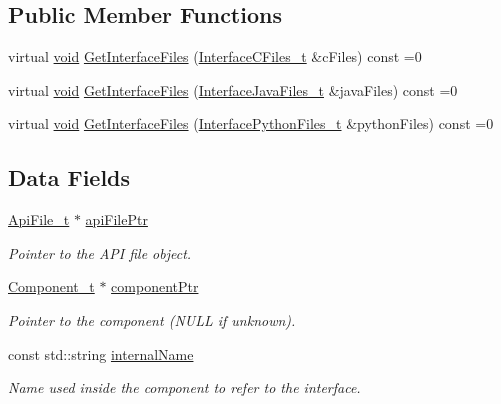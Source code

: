 \subsection*{Public Member Functions}
\begin{DoxyCompactItemize}
\item 
virtual \hyperlink{_t_e_m_p_l_a_t_e__cdef_8h_ac9c84fa68bbad002983e35ce3663c686}{void} \hyperlink{struct_api_ref__t_a30233624621144e938e03ddc03d51281}{Get\+Interface\+Files} (\hyperlink{struct_interface_c_files__t}{Interface\+C\+Files\+\_\+t} \&c\+Files) const =0
\item 
virtual \hyperlink{_t_e_m_p_l_a_t_e__cdef_8h_ac9c84fa68bbad002983e35ce3663c686}{void} \hyperlink{struct_api_ref__t_ab036b166dcf0eab493677caa0fa1dacb}{Get\+Interface\+Files} (\hyperlink{struct_interface_java_files__t}{Interface\+Java\+Files\+\_\+t} \&java\+Files) const =0
\item 
virtual \hyperlink{_t_e_m_p_l_a_t_e__cdef_8h_ac9c84fa68bbad002983e35ce3663c686}{void} \hyperlink{struct_api_ref__t_a972a6331e40d3ca8f3600cf9b007cd01}{Get\+Interface\+Files} (\hyperlink{struct_interface_python_files__t}{Interface\+Python\+Files\+\_\+t} \&python\+Files) const =0
\end{DoxyCompactItemize}
\subsection*{Data Fields}
\begin{DoxyCompactItemize}
\item 
\hyperlink{struct_api_file__t}{Api\+File\+\_\+t} $\ast$ \hyperlink{struct_api_ref__t_ab7686ae33717fec381c3fdbda2af45e5}{api\+File\+Ptr}
\begin{DoxyCompactList}\small\item\em Pointer to the A\+PI file object. \end{DoxyCompactList}\item 
\hyperlink{struct_component__t}{Component\+\_\+t} $\ast$ \hyperlink{struct_api_ref__t_ac359ce19c6cd21ac7d193fa17f4da468}{component\+Ptr}
\begin{DoxyCompactList}\small\item\em Pointer to the component (N\+U\+LL if unknown). \end{DoxyCompactList}\item 
const std\+::string \hyperlink{struct_api_ref__t_a42c611d9424fadbc56c1bce7bdebf708}{internal\+Name}
\begin{DoxyCompactList}\small\item\em Name used inside the component to refer to the interface. \end{DoxyCompactList}\end{DoxyCompactItemize}
